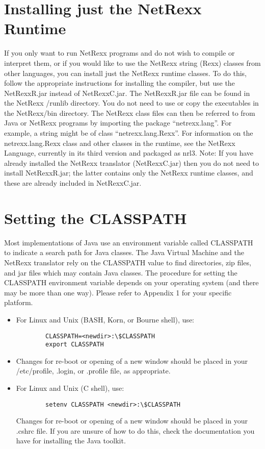 \section{Installing just the NetRexx Runtime}
If you only want to run NetRexx programs and do not wish to compile or interpret them, or if you would like to use the NetRexx string (Rexx) classes from other languages, you can install just the NetRexx runtime classes. 
To do this, follow the appropriate instructions for installing the compiler, but use the NetRexxR.jar instead of NetRexxC.jar. The NetRexxR.jar file can be found in the NetRexx /runlib directory. 
You do not need to use or copy the executables in the NetRexx/bin directory. 
The NetRexx class files can then be referred to from Java or NetRexx programs by importing the package “netrexx.lang”. For example, a string might be of class “netrexx.lang.Rexx”. 
For information on the netrexx.lang.Rexx class and other classes in the runtime, see the NetRexx Language, currently in its third version and packaged as nrl3. 
Note: If you have already installed the NetRexx translator (NetRexxC.jar) then you do not need to install NetRexxR.jar; the latter contains only the NetRexx runtime classes, and these are already included in NetRexxC.jar. 

\section{Setting the CLASSPATH}
Most implementations of Java use an environment variable called CLASSPATH to indicate a search path for Java classes. The Java Virtual Machine and the NetRexx translator rely on the CLASSPATH value to find directories, zip files, and jar files which may contain Java classes. 
The procedure for setting the CLASSPATH environment variable depends on your operating system (and there may be more than one way). Please refer to Appendix 1 for your specific platform.
\begin{itemize}
\item For Linux and Unix (BASH, Korn, or Bourne shell), use:
\begin{verbatim}
        CLASSPATH=<newdir>:\$CLASSPATH 
        export CLASSPATH
\end{verbatim}

\item Changes for re-boot or opening of a new window should be placed in your /etc/profile, .login, or .profile file, as appropriate. 
\item For Linux and Unix (C shell), use:
\begin{verbatim}
        setenv CLASSPATH <newdir>:\$CLASSPATH 
\end{verbatim}
Changes for re-boot or opening of a new window should be placed in your .cshrc file. If you are unsure of how to do this, check the documentation you have for installing the Java toolkit. 
\end{itemize}

